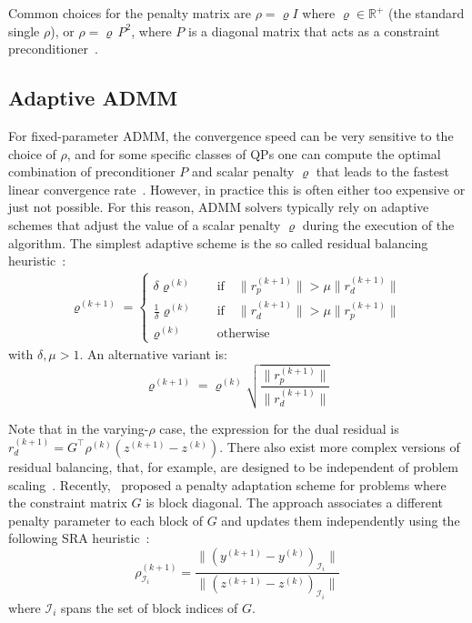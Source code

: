 \documentclass[letterpaper, 10 pt, conference]{ieeeconf}  %
\begin{document}
Common choices for the penalty matrix are $\rho = \varrho I$  where $\varrho \in \mathbb{R}^+$ (the standard single $\rho$), or $\rho = \varrho\, P^2$, where $P$ is a diagonal matrix that acts as a constraint preconditioner~\cite{Stellato2020}.

\subsection{Adaptive ADMM}
For fixed-parameter ADMM, the convergence speed can be very sensitive to the choice of $\rho$, and for some specific classes of QPs one can compute the optimal combination of preconditioner $P$ and scalar penalty $\varrho$ that leads to the fastest linear convergence rate~\cite{optimal_rho}. However, in practice this is often either too expensive or just not possible. For this reason, ADMM solvers typically rely on adaptive schemes that adjust the value of a scalar penalty $\varrho$ during the execution of the algorithm. The simplest adaptive scheme is the so called residual balancing heuristic~\cite{boyd_admm}:
\begin{equation}
\label{eq:rb}
\begin{aligned}
    \varrho^{(k+1)} = \begin{cases}
        \delta \varrho^{(k)} \quad&\text{if}\quad \|r_p^{(k+1)}\| > \mu \|r_d^{(k+1)}\|\\ 
        \frac{1}{\delta} \varrho^{(k)} \quad&\text{if}\quad \|r_d^{(k+1)}\| > \mu \|r_p^{(k+1)}\|\\ 
        \varrho^{(k)} \quad &\text{otherwise}
    \end{cases}
\end{aligned}
\end{equation}
with $\delta,\mu > 1$. An alternative variant is:
\begin{equation}
\label{eq:rb_sqrt}
    \varrho^{(k+1)} = \varrho^{(k)} \sqrt{\frac{\|r_p^{(k+1)}\|}{\|r_d^{(k+1)}\|}}
\end{equation} 

Note that in the varying-$\rho$ case, the expression for the dual residual is $r_d^{(k+1)} = G^{\top}\rho^{(k)}(z^{(k+1)} - z^{(k)})$.
There also exist more complex versions of residual balancing, that, for example, are designed to be independent of problem scaling~\cite{residual_balancing, Stellato2020}. 
%
Recently,~\cite{multiblock_admm} proposed a penalty adaptation scheme for problems where the constraint matrix $G$ is block diagonal. The approach associates a different penalty parameter to each block of $G$ and updates them independently using the following SRA heuristic~\cite{sra}:
\begin{equation}
\label{eq:sra}
    \rho_{\mathcal{I}_i}^{(k+1)} = \frac{\|\left( y^{(k+1)} - y^{(k)} \right)_{\mathcal{I}_i} \|}{\|\left( z^{(k+1)} - z^{(k)} \right)_{\mathcal{I}_i} \|}
\end{equation}
where $\mathcal{I}_i$ spans the set of block indices of $G$.
\end{document}
